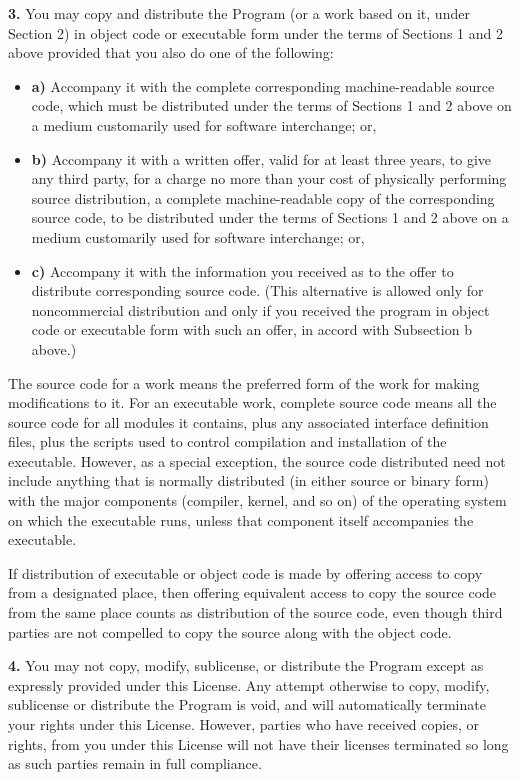 {\bf 3.} You may copy and distribute the Program (or a work based on it, under
Section 2) in object code or executable form under the terms of Sections 1 and
2 above provided that you also do one of the following:

\begin{itemize}
\item {\bf a)} Accompany it with the complete corresponding  machine-readable
   source code, which must be distributed under the terms of  Sections 1 and 2
   above on a medium customarily used for software interchange;  or,

\item {\bf b)} Accompany it with a written offer, valid for at least  three
   years, to give any third party, for a charge no more than your cost of
   physically performing source distribution, a complete machine-readable copy of
   the corresponding source code, to be distributed under the terms of Sections
   1  and 2 above on a medium customarily used for software interchange; or,

\item {\bf c)} Accompany it with the information you received as to  the offer
   to distribute corresponding source code. (This alternative is  allowed only
   for noncommercial distribution and only if you received the  program in object
   code or executable form with such an offer, in accord with  Subsection b
   above.)
\end{itemize}

The source code for a work means the preferred form of the work for making
modifications to it. For an executable work, complete source code means all
the source code for all modules it contains, plus any associated interface
definition files, plus the scripts used to control compilation and
installation of the executable. However, as a special exception, the source
code distributed need not include anything that is normally distributed (in
either source or binary form) with the major components (compiler, kernel, and
so on) of the operating system on which the executable runs, unless that
component itself accompanies the executable.

If distribution of executable or object code is made by offering access to
copy from a designated place, then offering equivalent access to copy the
source code from the same place counts as distribution of the source code,
even though third parties are not compelled to copy the source along with the
object code.

{\bf 4.} You may not copy, modify, sublicense, or distribute the Program
except as expressly provided under this License. Any attempt otherwise to
copy, modify, sublicense or distribute the Program is void, and will
automatically terminate your rights under this License. However, parties who
have received copies, or rights, from you under this License will not have
their licenses terminated so long as such parties remain in full compliance.

